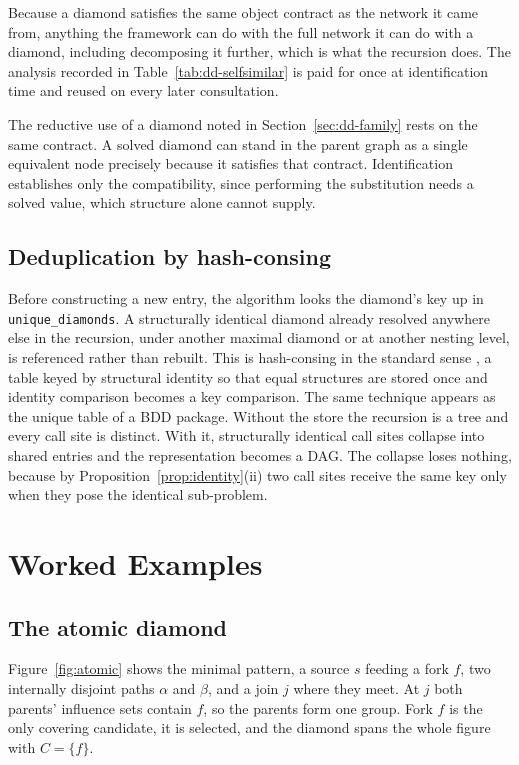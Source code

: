 \documentclass[12pt]{report}
\begin{document}
Because a diamond satisfies the same object contract as the network it came from, anything the framework can do with the full network it can do with a diamond, including decomposing it further, which is what the recursion does. The analysis recorded in Table~\ref{tab:dd-selfsimilar} is paid for once at identification time and reused on every later consultation.

\label{sec:dd-supernode}
The reductive use of a diamond noted in Section~\ref{sec:dd-family} rests on the same contract. A solved diamond can stand in the parent graph as a single equivalent node precisely because it satisfies that contract. Identification establishes only the compatibility, since performing the substitution needs a solved value, which structure alone cannot supply.

\subsection{Deduplication by hash-consing}
\label{sec:dd-hashconsing}

Before constructing a new entry, the algorithm looks the diamond's key up in \texttt{unique\_diamonds}. A structurally identical diamond already resolved anywhere else in the recursion, under another maximal diamond or at another nesting level, is referenced rather than rebuilt. This is hash-consing in the standard sense \cite{ershov1958programming,filliatre2006hashconsing}, a table keyed by structural identity so that equal structures are stored once and identity comparison becomes a key comparison. The same technique appears as the unique table of a BDD package. Without the store the recursion is a tree and every call site is distinct. With it, structurally identical call sites collapse into shared entries and the representation becomes a DAG. The collapse loses nothing, because by Proposition~\ref{prop:identity}(ii) two call sites receive the same key only when they pose the identical sub-problem.

\section{Worked Examples}
\label{sec:dd-examples}

\subsection{The atomic diamond}
\label{sec:dd-atomic}

Figure~\ref{fig:atomic} shows the minimal pattern, a source $s$ feeding a fork $f$, two internally disjoint paths $\alpha$ and $\beta$, and a join $j$ where they meet. At $j$ both parents' influence sets contain $f$, so the parents form one group. Fork $f$ is the only covering candidate, it is selected, and the diamond spans the whole figure with $C = \{f\}$.
\end{document}
